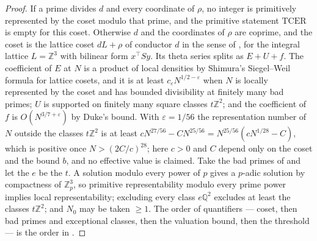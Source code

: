
\begin{proof}
If a prime divides $d$ and every coordinate of $ρ$, no integer is primitively represented by the coset modulo that prime, and the primitive statement $\mathrm{TCER}$ is empty for this coset. Otherwise $d$ and the coordinates of $ρ$ are coprime, and the coset is the lattice coset $dL + ρ$ of conductor $d$ in the sense of \cite{KK26}, for the integral lattice $L = ℤ^{3}$ with bilinear form $x^{\top}Sy$. Its theta series splits as $E + U + f$. The coefficient of $E$ at $N$ is a product of local densities by Shimura's Siegel--Weil formula for lattice cosets, and it is at least $c_{ε}N^{1/2 - ε}$ when $N$ is locally represented by the coset and has bounded divisibility at finitely many bad primes; $U$ is supported on finitely many square classes $tℤ^{2}$; and the coefficient of $f$ is $O(N^{3/7 + ε})$ by Duke's bound. With $ε = 1/56$ the representation number of $N$ outside the classes $tℤ^{2}$ is at least $cN^{27/56} - CN^{25/56} = N^{25/56}(cN^{1/28} - C)$, which is positive once $N > (2C/c)^{28}$; here $c > 0$ and $C$ depend only on the coset and the bound $b$, and no effective value is claimed. Take the bad primes of \cite{KK26} and let the $e$ be the $t$. A solution modulo every power of $p$ gives a $p$-adic solution by compactness of $ℤ_{p}^{3}$, so primitive representability modulo every prime power implies local representability; excluding every class $eℚ^{2}$ excludes at least the classes $tℤ^{2}$; and $N_{0}$ may be taken $≥ 1$. The order of quantifiers --- coset, then bad primes and exceptional classes, then the valuation bound, then the threshold --- is the order in \cite{KK26}.
\end{proof}

